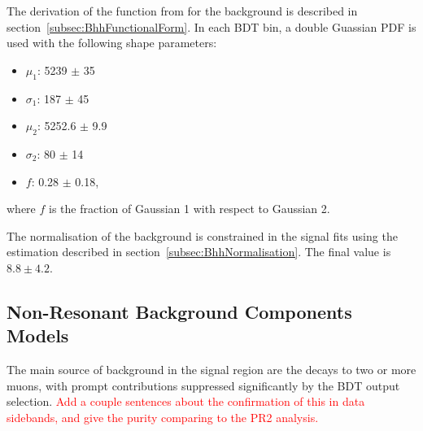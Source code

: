 The derivation of the function from for the \Bhh background is described in section~\ref{subsec:BhhFunctionalForm}. In each BDT bin, a double Guassian PDF is used with the following shape parameters:
\begin{itemize}
\item $\mu_1$: 5239 $\pm$ 35
\item $\sigma_1$: 187 $\pm$ 45
\item $\mu_2$: 5252.6 $\pm$ 9.9
\item $\sigma_2$: 80 $\pm$ 14
\item $f$: 0.28 $\pm$ 0.18, 
\end{itemize}
where $f$ is the fraction of Gaussian 1 with respect to Gaussian 2. 

The normalisation of the \Bhh background is constrained in the signal fits using the estimation described in section~\ref{subsec:BhhNormalisation}. The final value is $8.8 \pm 4.2$.


\clearpage 

\subsection{Non-Resonant Background Components Models}
\label{subsec:NonResonantBkgModel}

The main source of background in the signal region are the \bb decays to two or more muons, with prompt contributions suppressed significantly by the BDT output selection. \textcolor{red}{Add a couple sentences about the confirmation of this in data sidebands, and give the purity comparing to the PR2 analysis.}

